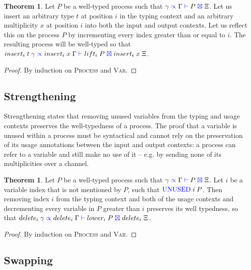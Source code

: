 \documentclass[a4paper,UKenglish,cleveref, autoref, thm-restate,authorcolumns]{lipics-v2019}
\theoremstyle{definition}
\newtheorem{nitheorem}[theorem]{Theorem}
\newcommand{\type}[1]{\textcolor{blue}{\operatorname{#1}}}
\newcommand{\types}[4]{#1 \; \type{\propto} \; #2 \; \type{\vdash} \; #3 \; \type{\boxtimes} \; #4}
\newcommand{\Unused}{\type{UNUSED}}
\begin{document}
\begin{nitheorem}
  \label{thm:weakening}
  Let $P$ be a well-typed process such that $\types{\gamma}{\Gamma}{P}{\Xi}$.
  Let us insert an arbitrary type $t$ at position $i$ in the typing context and an arbitrary multiplicity $x$ at position $i$ into both the input and output contexts.
  Let us reflect this on the process $P$ by incrementing every index greater than or equal to $i$.
  The resulting process will be well-typed so that $\types{insert_i \; t \; \gamma}{insert_i \; x \; \Gamma}{lift_i \; P}{insert_i \; x \; \Xi}$.
\end{nitheorem}
\begin{proof}
  By induction on \textsc{Process} and \textsc{Var}.
\end{proof}

\subsection{Strengthening}

Strengthening states that removing unused variables from the typing and usage contexts preserves the well-typedness of a process.
The proof that a variable is unused within a process must be syntactical and cannot rely on the preservation of its usage annotations between the input and output contexts: a process can refer to a variable and still make no use of it -- e.g. by sending none of its multiplicities over a channel.

\begin{nitheorem}
  \label{thm:strengthening}
  Let $P$ be a well-typed process such that $\types{\gamma}{\Gamma}{P}{\Xi}$.
  Let $i$ be a variable index that is not mentioned by $P$, such that $\Unused \; i \; P$.
  Then removing index $i$ from the typing context and both of the usage contexts and decrementing every variable in $P$ greater than $i$ preserves its well typedness, so that $\types{delete_i \; \gamma}{delete_i \; \Gamma}{lower_i \; P}{delete_i \; \Xi}$.
\end{nitheorem}
\begin{proof}
  By induction on \textsc{Process} and \textsc{Var}.
\end{proof}

\subsection{Swapping}
\end{document}
